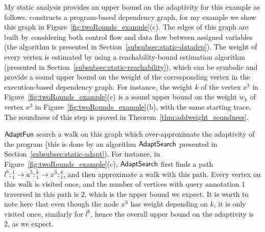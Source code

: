 My static analysis provides an upper bound on the adaptivity for this example as follows.
{\THESYSTEM} constructs a program-based dependency graph, for my example we show this graph in 
Figure~\ref{fig:twoRounds_example}(c).
The edges of this graph are built by considering both control flow and data flow between assigned variables (the algorithm is presented in Section~\ref{subsubsec:static-datadep}). 
The weight of every vertex is estimated by using a reachability-bound estimation algorithm 
(presented in Section~\ref{subsubsec:static-reachability}), which can be symbolic and provide a sound upper bound on the weight of the corresponding vertex in the execution-based dependency graph. 
For instance, the weight $k$ of the vertex $x^{3}$ in Figure~\ref{fig:twoRounds_example}(c) is a sound upper bound on the weight $w_k$ of vertex $x^{3}$ in Figure~\ref{fig:twoRounds_example}(b), with the same starting trace. 
The soundness of this step is proved in Theorem~\ref{thm:addweight_soundness}.

$\textsf{AdaptFun}$ search a walk on this graph which over-approximate the adaptivity of the program (this is done by an algorithm
$\mathsf{AdaptSearch}$ presented in  Section~\ref{subsubsec:static-adapt}). 
For instance, in Figure~\ref{fig:twoRounds_example}(c), $\mathsf{AdaptSearch}$ first finds a path $l^6:{}^1_1 \to a^5: {}^k_1 \to x^3: {}^k_1$, and then approximate a walk with this path.
Every vertex on this walk is visited once, and the number of vertices with query annotation $1$ traversed in this path is $2$, which is the upper bound we expect.
It is worth to note here that even though the node $x^3$ has weight depending on $k$, 
it is only visited once, similarly for $l^6$, hence the overall upper bound on the adaptivity is 2, as we expect.